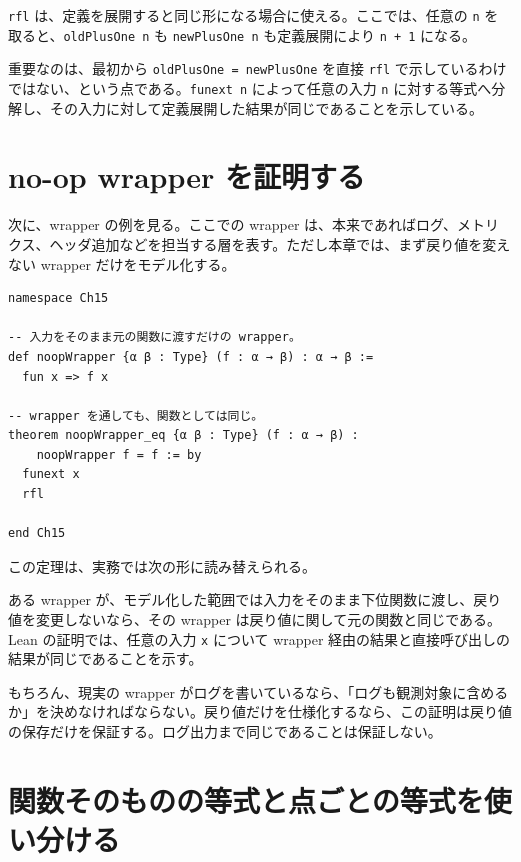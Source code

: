 \texttt{rfl} は、定義を展開すると同じ形になる場合に使える。ここでは、任意の \texttt{n} を取ると、\texttt{oldPlusOne n} も \texttt{newPlusOne n} も定義展開により \texttt{n + 1} になる。

重要なのは、最初から \texttt{oldPlusOne = newPlusOne} を直接 \texttt{rfl} で示しているわけではない、という点である。\texttt{funext n} によって任意の入力 \texttt{n} に対する等式へ分解し、その入力に対して定義展開した結果が同じであることを示している。

\section{no-op wrapper を証明する}

次に、wrapper の例を見る。ここでの wrapper は、本来であればログ、メトリクス、ヘッダ追加などを担当する層を表す。ただし本章では、まず戻り値を変えない wrapper だけをモデル化する。

\begin{listing}[htbp]
\begin{verbatim}
namespace Ch15

-- 入力をそのまま元の関数に渡すだけの wrapper。
def noopWrapper {α β : Type} (f : α → β) : α → β :=
  fun x => f x

-- wrapper を通しても、関数としては同じ。
theorem noopWrapper_eq {α β : Type} (f : α → β) :
    noopWrapper f = f := by
  funext x
  rfl

end Ch15
\end{verbatim}
\caption{何もしない wrapper は元の関数と等しい}
\label{lst:ch15-noop-wrapper}
\end{listing}

この定理は、実務では次の形に読み替えられる。

\begin{softwarebox}
ある wrapper が、モデル化した範囲では入力をそのまま下位関数に渡し、戻り値を変更しないなら、その wrapper は戻り値に関して元の関数と同じである。Lean の証明では、任意の入力 \texttt{x} について wrapper 経由の結果と直接呼び出しの結果が同じであることを示す。
\end{softwarebox}

もちろん、現実の wrapper がログを書いているなら、「ログも観測対象に含めるか」を決めなければならない。戻り値だけを仕様化するなら、この証明は戻り値の保存だけを保証する。ログ出力まで同じであることは保証しない。

\section{関数そのものの等式と点ごとの等式を使い分ける}

